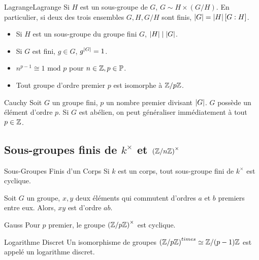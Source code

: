 \documentclass{cours}
\begin{document}
\begin{théorème}{Lagrange}{Lagrange}
    Si $H$ est un sous-groupe de $G$, $G \sim H \times (G/H)$. En particulier, si deux des trois ensembles $G, H, G/H$ sont finis, $\left|G\right| = \left|H\right|\left[G : H\right]$.
\end{théorème}
\begin{corollaire}{}{}
    \begin{itemize}
        \item Si $H$ est un sous-groupe du groupe fini $G$, $\left|H\right| \mid \left|G\right|$.
        \item Si $G$ est fini, $g\in G$, $g^{\left|G\right|} = 1$.
        \item $n^{p-1} \cong 1 \text{ mod } p$ pour $n\in \mathbb{Z}, p \in \mathbb{P}$.
        \item Tout groupe d'ordre premier $p$ est isomorphe à $\mathbb{Z}/p\mathbb{Z}$.
    \end{itemize}
\end{corollaire}

\begin{théorème}{Cauchy}{}
    Soit $G$ un groupe fini, $p$ un nombre premier divisant $\left|G\right|$. $G$ possède un élément d'ordre $p$. Si $G$ est abélien, on peut généraliser immédiatement à tout $p \in \mathbb{Z}$.
\end{théorème}

\subsection{Sous-groupes finis de $k^{\times}$ et $\left(\mathbb{Z}/n\mathbb{Z}\right)^{\times}$}
\begin{théorème}{Sous-Groupes Finis d'un Corps}{}
    Si $k$ est un corps, tout sous-groupe fini de $k^{\times}$ est cyclique.
\end{théorème}

\begin{lemma}[Cauchy]
    Soit $G$ un groupe, $x, y$ deux éléments qui commutent d'ordres $a$ et $b$ premiers entre eux. Alors, $xy$ est d'ordre $ab$.
\end{lemma}

\begin{théorème}{Gauss}{}
    Pour $p$ premier, le groupe $\left(\mathbb{Z}/p\mathbb{Z}\right)^{\times}$ est cyclique.
\end{théorème}

\begin{définition}{Logarithme Discret}{}
    Un isomorphisme de groupes $\left(\mathbb{Z}/p\mathbb{Z}\right)^{times} \simeq \mathbb{Z}/(p-1)\mathbb{Z}$ est appelé un logarithme discret.
\end{définition}
\end{document}

